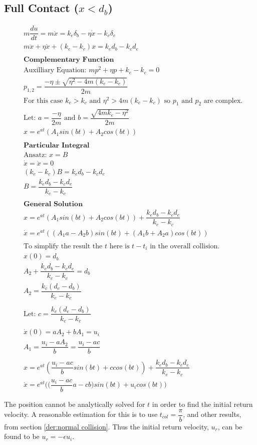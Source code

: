 \documentclass[10pt,a4paper,titlepage]{report}
\begin{document}
\subsection{Full Contact ($x < d_b$)}
\begin{align*}
&m \dfrac{du}{dt} = m \ddot{x} = k_e \delta_b - \eta \dot{x} - k_c \delta_e \\
&m\ddot{x} + \eta \dot{x} + (k_e - k_c) x = k_e d_b - k_c d_e \\\\
&\textbf{Complementary Function} \\
&\text{Auxilliary Equation: } mp^2 + \eta p + k_e - k_c = 0 \\
&p_{1,2} = \dfrac{- \eta \pm \sqrt{\eta^2 - 4m(k_e - k_c)}}{2 m} \\
&\text{For this case $k_e > k_c$ and $\eta ^ 2 > 4 m (k_e - k_c)$ so $p_1$ and $p_2$ are complex.} \\
&\text{Let: } a = \dfrac{-\eta}{2m} \text{ and } b = \dfrac{\sqrt{4mk_e - \eta ^ 2}}{2m} \\
&x = e^{at} (A_1 sin(bt) + A_2 cos (bt)) \\\\
&\textbf{Particular Integral} \\
&\text{Ansatz: } x = B \\
&\dot{x} = \ddot{x} = 0 \\
&(k_e - k_c)B = k_e d_b - k_c d_e \\
& B = \dfrac{k_e d_b - k_c d_e}{k_e - k_c} \\\\
&\textbf{General Solution} \\
&x = e^{at} (A_1 sin(bt) + A_2 cos (bt)) + \dfrac{k_e d_b - k_c d_e}{k_e - k_c} \\
&\dot{x} = e^{at}((A_1 a - A_2 b)sin(bt) + (A_1 b + A_2 a) cos(bt)) \\\\
&\text{To simplify the result the $t$ here is $t - t_i$ in the overall collision.} \\
&x(0) = d_b \\
&A_2 + \dfrac{k_e d_b - k_c d_e}{k_e - k_c} = d_b \\
&A_2 = \dfrac{k_c (d_e - d_b)}{k_e - k_c} \\\\
&\text{Let: } c = \dfrac{k_c (d_e - d_b)}{k_e - k_c} \\\\
&\dot{x}(0) = aA_2 + bA_1 = u_i \\
&A_1 = \dfrac{u_i - aA_2}{b} = \dfrac{u_i - ac}{b} \\\\
&x = e^{at} (\dfrac{u_i - ac}{b} sin(bt) + c cos (bt)) + \dfrac{k_e d_b - k_c d_e}{k_e - k_c} \\
&\dot{x} = e^{at}\Big(\Big(\dfrac{u_i - ac}{b} a - c b\Big)sin(bt) + u_i cos(bt)\Big) \\\\
\end{align*}
The position cannot be analytically solved for $t$ in order to find the initial return velocity. A reasonable estimation for this is to use $t_{col} = \dfrac{\pi}{b}$, and other results, from section \ref{der:normal collision}. Thus the initial return velocity, $u_r$, can be found to be $u_r = - \epsilon u_i$.
\end{document}
